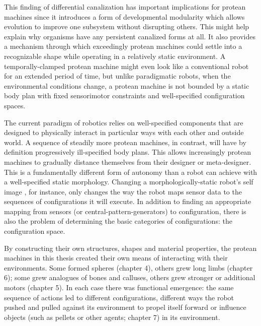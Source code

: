 This finding of differential canalization has important implications
for protean machines since it introduces a form of developmental modularity
which
allows evolution to improve one subsystem without disrupting others.
This might help explain why organisms have any persistent canalized forms at all.
It also provides a mechanism through which exceedingly protean machines could settle into a recognizable shape while operating in a relatively static environment.
A temporally-clamped protean machine might even look like a conventional robot for an extended period of time, but unlike paradigmatic robots, when the environmental conditions change, a protean machine is not bounded by a static body plan with fixed sensorimotor constraints and well-specified configuration spaces.

The current paradigm of robotics relies on well-specified components that are designed to physically interact in particular ways with each other and outside world.
A sequence of steadily more protean machines, in contrast, will have by definition progressively ill-specified body plans.
This allows increasingly protean machines to gradually distance themselves from their designer or meta-designer.
This is a fundamentally different form of autonomy than a robot can achieve with a well-specified static morphology.
Changing a morphologically-static robot's self image \cite{bongard2006resilient,cully2015robots}, for instance, 
only changes the way the robot maps sensor data to 
the sequences of configurations it will execute.
In addition to finding an appropriate mapping from sensors (or central-pattern-generators) to configuration, 
there is also the problem of determining the basic categories of configurations: the configuration space.

By constructing their own structures, shapes and material properties, 
the protean machines in this thesis created their own means of interacting with their environments.
Some formed spheres (chapter 4), others grew long limbs (chapter 6); 
some grew analogues of bones and calluses, others grew stronger or additional motors (chapter 5).
In each case there was functional emergence: 
the same sequence of actions led to different configurations, different ways the robot pushed and pulled against its environment to propel itself forward or influence objects (such as pellets or other agents; chapter 7) in its environment.


